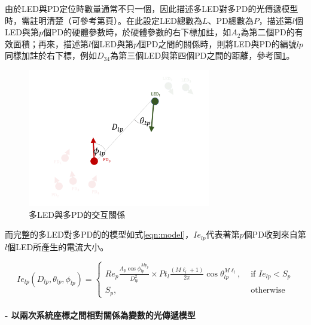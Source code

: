         \hfill
    
        由於LED與PD定位時數量通常不只一個，因此描述多LED對多PD的光傳遞模型時，需註明清楚（可參考第\pageref{chp:symbol}頁）。在此設定LED總數為$L$、PD總數為$P$，描述第$l$個LED與第$p$個PD的硬體參數時，於硬體參數的右下標加註，如$A_2$為第二個PD的有效面積；再來，描述第$l$個LED與第$p$個PD之間的關係時，則將LED與PD的編號$lp$同樣加註於右下標，例如$D_{34}$為第三個LED與第四個PD之間的距離，參考圖\ref{pic:interactive_mul}。
        
        \begin{figure}[htpb]
            \centering
            \includegraphics[width=8cm]{ch2pic/interactive_mul.png}
            \caption{多LED與多PD的交互關係}
            \label{pic:interactive_mul}
        \end{figure}
    
        而完整的多LED對多PD的的模型如式\ref{eqn:model}，$Ie_{lp}$代表著第$p$個PD收到來自第$l$個LED所產生的電流大小。
        
        \begin{equation}
            \label{eqn:model}
            Ie_{lp}(D_{lp},\theta_{lp},\phi_{lp}) = \begin{cases}Re_p \frac{ A_p\cos\phi_{lp}^{Mp_{p}} }{D^2_{lp}}\times Pt_l\frac{(M\ell_{l}+1)}{2 \pi} \cos \theta_{lp}^{M\ell_{l}}, & \text { if } Ie_{lp}<S_p \\ S_p, & \text { otherwise }\end{cases}
        \end{equation}
    
        
    
    
    
    
        \paragraph*{- 以兩次系統座標之間相對關係為變數的光傳遞模型}

